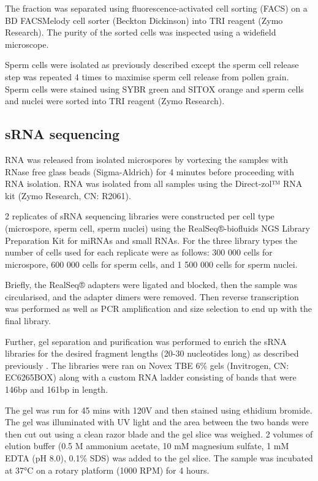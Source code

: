 The fraction was separated using fluorescence-activated cell sorting (FACS) on a BD FACSMelody cell sorter (Beckton Dickinson) into TRI reagent (Zymo Research). The purity of the sorted cells was inspected using a widefield microscope.

Sperm cells were isolated as previously described \citep{RN140,RN141} except the sperm cell release step was repeated 4 times to maximise sperm cell release from pollen grain. Sperm cells were stained using SYBR green and SITOX orange and sperm cells and nuclei were sorted into TRI reagent (Zymo Research).

\subsection{sRNA sequencing}

RNA was released from isolated microspores by vortexing the samples with RNase free glass beads (Sigma-Aldrich) for 4 minutes before proceeding with RNA isolation. RNA was isolated from all samples using the Direct-zol™ RNA kit (Zymo Research, CN: R2061).

2 replicates of sRNA sequencing libraries were constructed per cell type (microspore, sperm cell, sperm nuclei) using the RealSeq®-biofluids NGS Library Preparation Kit for miRNAs and small RNAs. For the three library types the number of cells used for each replicate were as follows: 300 000 cells for microspore, 600 000 cells for sperm cells, and 1 500 000 cells for sperm nuclei.

Briefly, the RealSeq® adapters were ligated and blocked, then the sample was circularised, and the adapter dimers were removed. Then reverse transcription was performed as well as PCR amplification and size selection to end up with the final library.

Further, gel separation  and purification was performed to enrich the sRNA libraries for the desired fragment lengths (20-30 nucleotides long) as described previously \citep{RN187}. The libraries were ran on Novex TBE 6\% gels (Invitrogen, CN: EC6265BOX) along with a custom RNA ladder consisting of bands that were 146bp and 161bp in length. 

The gel was run for 45 mins with 120V and then stained using ethidium bromide. The gel was illuminated with UV light and the area between the two bands were then cut out using a clean razor blade and the gel slice was weighed. 2 volumes of elution buffer (0.5 M ammonium acetate, 10 mM magnesium sulfate, 1 mM EDTA (pH 8.0), 0.1\% SDS) was added to the gel slice. The sample was incubated at 37°C on a rotary platform (1000 RPM) for 4 hours. 

